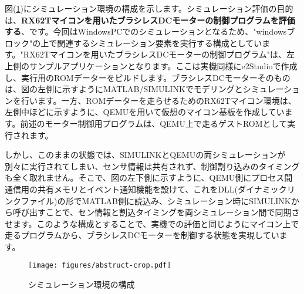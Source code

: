 \newpage
図(\ref{abstruct})にシミュレーション環境の構成を示します。シミュレーション評価の目的は、{\bf RX62Tマイコンを用いたブラシレスDCモーターの制御プログラムを評価する}、です。今回はWindowsPCでのシミュレーションとなるため、"windowsブロック"の上で関連するシミュレーション要素を実行する構成としています。"RX62Tマイコンを用いたブラシレスDCモーターの制御プログラム"は、左上側のサンプルアプリケーションとなります。ここは実機同様にe2Studioで作成し、実行用のROMデーターをビルドします。ブラシレスDCモーターそのものは、図の左側に示すようにMATLAB/SIMULINKでモデリングとシミュレーションを行います。一方、ROMデーターを走らせるためのRX62Tマイコン環境は、左側中ほどに示すように、QEMUを用いて仮想のマイコン基板を作成しています。前述のモーター制御用プログラムは、QEMU上で走るゲストROMとして実行されます。

しかし、このままの状態では、SIMULINKとQEMUの両シミュレーションが別々に実行されてしまい、センサ情報は共有されず、制御割り込みのタイミングも全く取れません。そこで、図の左下側に示すように、QEMU側にプロセス間通信用の共有メモリとイベント通知機能を設けて、これをDLL(ダイナミックリンクファイル)の形でMATLAB側に読込み、シミュレーション時にSIMULINKから呼び出すことで、セン情報と割込タイミングを両シミュレーション間で同期させます。このような構成とすることで、実機での評価と同じようにマイコン上で走るプログラムから、ブラシレスDCモーターを制御する状態を実現しています。

\begin{figure}[htbp!]
\begin{center}
\texttt{[image: figures/abstruct-crop.pdf]}
\end{center}
\caption{シミュレーション環境の構成}
\label{abstruct}
\end{figure}

